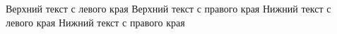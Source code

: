 \documentclass[a4paper, 12pt]{article}
\begin{document}
    Верхний текст с левого края \hfill Верхний текст с правого края %
    \vfill %
    Нижний текст с левого края \hfill Нижний текст с правого края %
\end{document}
